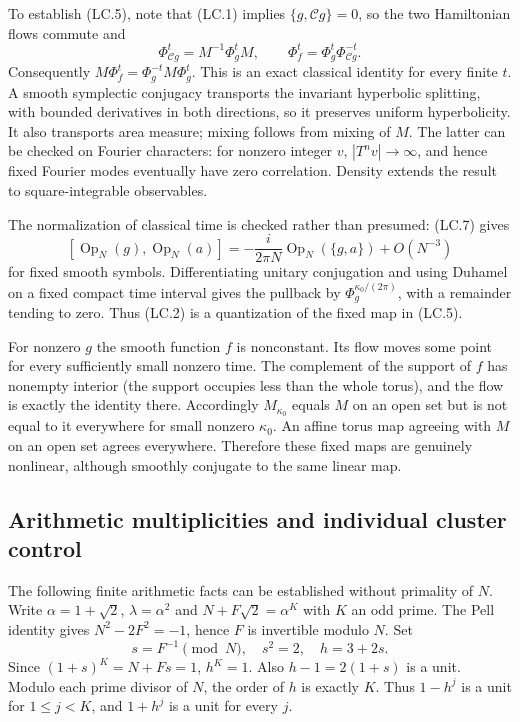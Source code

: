 To establish (LC.5), note that (LC.1) implies \(\{g,\mathcal Cg\}=0\), so the two Hamiltonian flows commute and \[
 \Phi_{\mathcal Cg}^t=M^{-1}\Phi_g^tM,\qquad
 \Phi_f^t=\Phi_g^t\Phi_{\mathcal Cg}^{-t}.
\] Consequently \(M\Phi_f^t=\Phi_g^{-t}M\Phi_g^t\). This is an exact classical identity for every finite \(t\). A smooth symplectic conjugacy transports the invariant hyperbolic splitting, with bounded derivatives in both directions, so it preserves uniform hyperbolicity. It also transports area measure; mixing follows from mixing of \(M\). The latter can be checked on Fourier characters: for nonzero integer \(v\), \(|T^nv|\to\infty\), and hence fixed Fourier modes eventually have zero correlation. Density extends the result to square-integrable observables.

The normalization of classical time is checked rather than presumed: (LC.7) gives \[
 [\operatorname{Op}_N(g),\operatorname{Op}_N(a)]
 =-\frac{i}{2\pi N}\operatorname{Op}_N(\{g,a\})+O(N^{-3})
\] for fixed smooth symbols. Differentiating unitary conjugation and using Duhamel on a fixed compact time interval gives the pullback by \(\Phi_g^{{\kappa_0}/(2\pi)}\), with a remainder tending to zero. Thus (LC.2) is a quantization of the fixed map in (LC.5).

For nonzero \(g\) the smooth function \(f\) is nonconstant. Its flow moves some point for every sufficiently small nonzero time. The complement of the support of \(f\) has nonempty interior (the support occupies less than the whole torus), and the flow is exactly the identity there. Accordingly \(M_{\kappa_0}\) equals \(M\) on an open set but is not equal to it everywhere for small nonzero \({\kappa_0}\). An affine torus map agreeing with \(M\) on an open set agrees everywhere. Therefore these fixed maps are genuinely nonlinear, although smoothly conjugate to the same linear map.

\subsection{Arithmetic multiplicities and individual cluster control}\label{locality:arithmetic-multiplicities-and-individual-cluster-control}

The following finite arithmetic facts can be established without primality of \(N\). Write \(\alpha=1+\sqrt2\), \(\lambda=\alpha^2\) and \(N+F\sqrt2=\alpha^K\) with \(K\) an odd prime. The Pell identity gives \(N^2-2F^2=-1\), hence \(F\) is invertible modulo \(N\). Set \[
 s=F^{-1}\pmod N,\quad s^2=2,\quad h=3+2s.
\] Since \((1+s)^K=N+Fs=1\), \(h^K=1\). Also \(h-1=2(1+s)\) is a unit. Modulo each prime divisor of \(N\), the order of \(h\) is exactly \(K\). Thus \(1-h^j\) is a unit for \(1\leq j<K\), and \(1+h^j\) is a unit for every \(j\).

